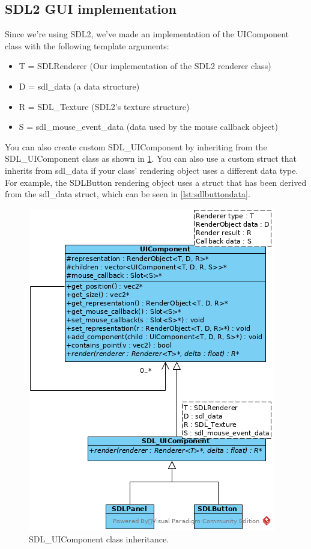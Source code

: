 \subsection{SDL2 GUI implementation}
\label{sec:sdl2gui}

Since we're using SDL2, we've made an implementation of the UIComponent class
 with the following template arguments:
\begin{itemize}
\item T = SDLRenderer (Our implementation of the SDL2 renderer class)
\item D = sdl\_data (a data structure)
\item R = SDL\_Texture (SDL2's texture structure)
\item S = sdl\_mouse\_event\_data (data used by the mouse callback object)
\end{itemize}

You can also create custom SDL\_UIComponent by inheriting from the 
SDL\_UIComponent class as shown in \cref{fig:sdluicomponent-inherit}. You can 
also use a custom struct that inherits from sdl\_data if your class' 
rendering object uses a different data type. For example, the SDLButton 
rendering object uses a struct that has been derived from the sdl\_data 
struct, which can be seen in \cref{lst:sdlbuttondata}.

\begin{figure}[!htb]
\centering
\includegraphics[scale=0.75]{res/ui/sdluicomponent-inherit.png}
\caption{SDL\_UIComponent class inheritance.}\label{fig:sdluicomponent-inherit}
\end{figure}

